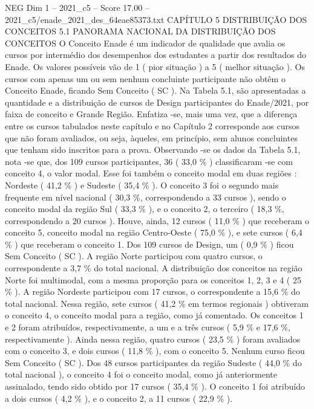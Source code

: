\begin{textsample}{NEG Dim 1 – 2021\_c5 – Score 17.00 – 2021\_c5/enade\_2021\_des\_64eae85373.txt}  \label{ex:f1_neg_408}
CAPÍTULO 5 DISTRIBUIÇÃO DOS CONCEITOS 5.1 PANORAMA NACIONAL DA DISTRIBUIÇÃO DOS CONCEITOS O Conceito Enade é um indicador de qualidade que avalia os cursos por intermédio dos desempenhos dos estudantes a partir dos resultados do Enade.
Os valores possíveis vão de 1 ( pior situação ) a 5 ( melhor situação ).
Os cursos com apenas um ou sem nenhum concluinte participante não obtêm o Conceito Enade, ficando Sem Conceito ( SC ).
Na Tabela 5.1, são apresentadas a quantidade e a distribuição de cursos de Design participantes do Enade/2021, por faixa de conceito e Grande Região.
Enfatiza -se, mais uma vez, que a diferença entre os cursos tabulados neste capítulo e no Capítulo 2 corresponde aos cursos que não foram avaliados, ou seja, àqueles, em princípio, sem alunos concluintes que tenham sido inscritos para a prova.
Observando -se os dados da Tabela 5.1, nota -se que, dos 109 cursos participantes, 36 ( 33,0 \% ) classificaram -se com conceito 4, o valor modal.
Esse foi também o conceito modal em duas regiões : Nordeste ( 41,2 \% ) e Sudeste ( 35,4 \% ).
O conceito 3 foi o segundo mais frequente em nível nacional ( 30,3 \%, correspondendo a 33 cursos ), sendo o conceito modal da região Sul ( 33,3 \% ), e o conceito 2, o terceiro ( 18,3 \%, correspondendo a 20 cursos ).
Houve, ainda, 12 cursos ( 11,0 \% ) que receberam o conceito 5, conceito modal na região Centro-Oeste ( 75,0 \% ), e sete cursos ( 6,4 \% ) que receberam o conceito 1.
Dos 109 cursos de Design, um ( 0,9 \% ) ficou Sem Conceito ( SC ).
A região Norte participou com quatro cursos, o correspondente a 3,7 \% do total nacional.
A distribuição dos conceitos na região Norte foi multimodal, com a mesma proporção para os conceitos 1, 2, 3 e 4 ( 25 \% ).
A região Nordeste participou com 17 cursos, o correspondente a 15,6 \% do total nacional.
Nessa região, sete cursos ( 41,2 \% em termos regionais ) obtiveram o conceito 4, o conceito modal para a região, como já comentado.
Os conceitos 1 e 2 foram atribuídos, respectivamente, a um e a três cursos ( 5,9 \% e 17,6 \%, respectivamente ).
Ainda nessa região, quatro cursos ( 23,5 \% ) foram avaliados com o conceito 3, e dois cursos ( 11,8 \% ), com o conceito 5.
Nenhum curso ficou Sem Conceito ( SC ).
Dos 48 cursos participantes da região Sudeste ( 44,0 \% do total nacional ), o conceito 4 foi o conceito modal, como já anteriormente assinalado, tendo sido obtido por 17 cursos ( 35,4 \% ).
O conceito 1 foi atribuído a dois cursos ( 4,2 \% ), e o conceito 2, a 11 cursos ( 22,9 \% ).

\end{textsample}
